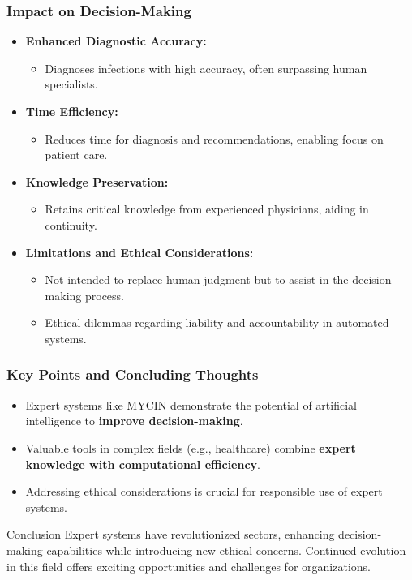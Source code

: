 \documentclass[aspectratio=169]{beamer}
\begin{document}
\begin{frame}[fragile]
    \frametitle{Impact on Decision-Making}
    \begin{itemize}
        \item \textbf{Enhanced Diagnostic Accuracy:}
        \begin{itemize}
            \item Diagnoses infections with high accuracy, often surpassing human specialists.
        \end{itemize}
        
        \item \textbf{Time Efficiency:}
        \begin{itemize}
            \item Reduces time for diagnosis and recommendations, enabling focus on patient care.
        \end{itemize}
        
        \item \textbf{Knowledge Preservation:}
        \begin{itemize}
            \item Retains critical knowledge from experienced physicians, aiding in continuity.
        \end{itemize}
        
        \item \textbf{Limitations and Ethical Considerations:}
        \begin{itemize}
            \item Not intended to replace human judgment but to assist in the decision-making process.
            \item Ethical dilemmas regarding liability and accountability in automated systems.
        \end{itemize}
    \end{itemize}
\end{frame}

\begin{frame}[fragile]
    \frametitle{Key Points and Concluding Thoughts}
    \begin{itemize}
        \item Expert systems like MYCIN demonstrate the potential of artificial intelligence to \textbf{improve decision-making}.
        \item Valuable tools in complex fields (e.g., healthcare) combine \textbf{expert knowledge with computational efficiency}.
        \item Addressing ethical considerations is crucial for responsible use of expert systems.
    \end{itemize}
    
    \begin{block}{Conclusion}
        Expert systems have revolutionized sectors, enhancing decision-making capabilities while introducing new ethical concerns. Continued evolution in this field offers exciting opportunities and challenges for organizations.
    \end{block}
\end{frame}
\end{document}
